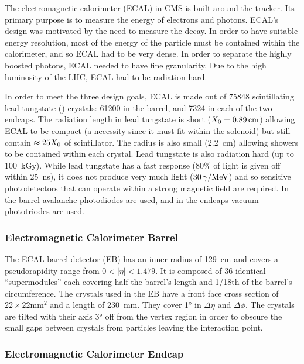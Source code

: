 The electromagnetic calorimeter (ECAL) in CMS is built around the tracker. Its
primary purpose is to measure the energy of electrons and photons. ECAL's
design was motivated by the need to measure the \higgstogammagamma decay. In
order to have suitable energy resolution, most of the energy of the particle
must be contained within the calorimeter, and so ECAL had to be very dense. In
order to separate the highly boosted photons, ECAL needed to have fine
granularity. Due to the high luminosity of the LHC, ECAL had to be radiation
hard.

In order to meet the three design goals, ECAL is made out of \num{75848}
scintillating lead tungstate (\leadtungstate) crystals: \num{61200} in the
barrel, and \num{7324} in each of the two endcaps. The radiation length in lead
tungstate is short ($X_{0} = \SI{0.89}{\centi\meter}$) allowing ECAL
to be compact (a necessity since it must fit within the solenoid) but still
contain $\approx 25X_{0}$ of scintillator. The \Moliere radius is
also small (\SI{2.2}{\centi\meter}) allowing showers to be contained within
each crystal. Lead tungstate is also radiation hard (up to
\SI{100}{\kilo\gray}). While lead tungstate has a fast response (80\% of light
is given off within \SI{25}{\nano\second}), it does not produce very much light
($\SI{30}{\photon\per\MeV}$) and so sensitive photodetectors that can operate
within a strong magnetic field are required. In the barrel avalanche
photodiodes are used, and in the endcaps vacuum phototriodes are used.

\subsubsection{Electromagnetic Calorimeter Barrel}

The ECAL barrel detector (EB) has an inner radius of \SI{129}{\centi\meter} and
covers a pseudorapidity range from $0 < |\eta| < 1.479$. It is composed of 36
identical ``supermodules'' each covering half the barrel's length and 1/18th of
the barrel's circumference. The crystals used in the EB have a front face cross
section of $22 \times 22 \si{\milli\meter\squared}$ and a length of
\SI{230}{\milli\meter}. They cover \ang{1} in $\Delta \eta$ and $\Delta \phi$.
The crystals are tilted with their axis \ang{3} off from the vertex region in
order to obscure the small gaps between crystals from particles leaving the
interaction point.

\subsubsection{Electromagnetic Calorimeter Endcap}

